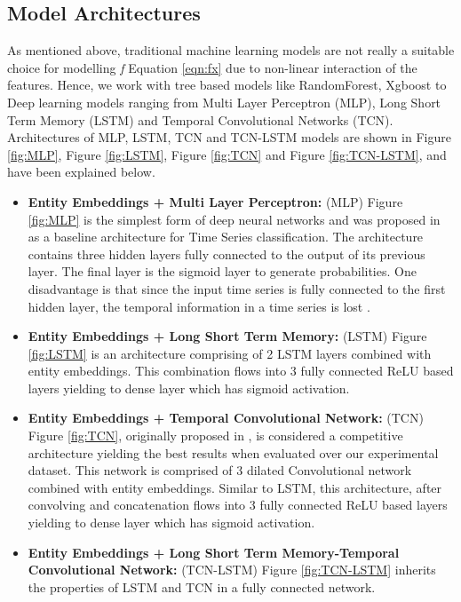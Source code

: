 \subsection{Model Architectures}
As mentioned above, traditional machine learning models are not really a suitable choice for modelling \emph{f} 
Equation \ref{eqn:fx} due to non-linear interaction of the features. Hence, we work with
tree based models like RandomForest, Xgboost \cite{chen2016xgboost} 
to Deep learning models ranging from Multi Layer Perceptron (MLP), Long Short 
Term Memory (LSTM) and Temporal Convolutional Networks (TCN). Architectures of MLP, LSTM, TCN \cite{lea2016temporal} 
and TCN-LSTM \cite{karim2017lstm} models are shown in Figure \ref{fig:MLP}, Figure \ref{fig:LSTM}, Figure \ref{fig:TCN}
and Figure \ref{fig:TCN-LSTM}, and have been explained below.
\begin{itemize}
\item {\bf Entity Embeddings + Multi Layer Perceptron:} (MLP) Figure \ref{fig:MLP} is the simplest form of deep neural networks and was 
proposed in \cite{wang2017time} as a baseline architecture for Time Series classification. The architecture contains 
three hidden layers fully connected to the output of its previous layer. The final layer 
is the sigmoid layer to generate probabilities. One disadvantage is that since the input time 
series is fully connected to the first hidden layer, the temporal information in a time series is lost \cite{fawaz2019deep1}.
\item {\bf Entity Embeddings + Long Short Term Memory:} (LSTM) Figure \ref{fig:LSTM} is an
architecture comprising of 2 LSTM layers combined with entity embeddings. This combination flows into 
3 fully connected ReLU based layers yielding to dense layer which has sigmoid activation.
\item {\bf Entity Embeddings + Temporal Convolutional Network:} (TCN) Figure \ref{fig:TCN}, originally
proposed in \cite{lea2016temporal} , is considered a competitive architecture yielding the best results when evaluated over 
our experimental dataset. This network is comprised of 3 dilated Convolutional network combined with entity embeddings.
Similar to LSTM, this architecture, after convolving and concatenation flows into 
3 fully connected ReLU based layers yielding to dense layer which has sigmoid activation.
\item {\bf Entity Embeddings + Long Short Term Memory-Temporal Convolutional Network:} (TCN-LSTM) Figure \ref{fig:TCN-LSTM} 
inherits the properties of LSTM and TCN in a fully connected network.
\end{itemize}
